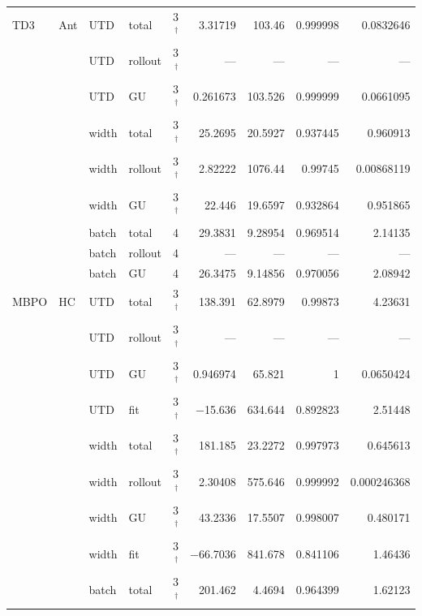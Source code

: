 {\begin{longtable}{@{}llllrrrrr@{}}
    TD3 & Ant & UTD & total & \num{3}$^{\dagger}$ & \num{3.31719} & \num{103.46} & \num{0.999998} & \num{0.0832646} \\
     &  & UTD & rollout & \num{3}$^{\dagger}$ & --- & --- & --- & --- \\
     &  & UTD & GU & \num{3}$^{\dagger}$ & \num{0.261673} & \num{103.526} & \num{0.999999} & \num{0.0661095} \\
     &  & width & total & \num{3}$^{\dagger}$ & \num{25.2695} & \num{20.5927} & \num{0.937445} & \num{0.960913} \\
     &  & width & rollout & \num{3}$^{\dagger}$ & \num{2.82222} & \num{1076.44} & \num{0.99745} & \num{0.00868119} \\
     &  & width & GU & \num{3}$^{\dagger}$ & \num{22.446} & \num{19.6597} & \num{0.932864} & \num{0.951865} \\
     &  & batch & total & \num{4} & \num{29.3831} & \num{9.28954} & \num{0.969514} & \num{2.14135} \\
     &  & batch & rollout & \num{4} & --- & --- & --- & --- \\
     &  & batch & GU & \num{4} & \num{26.3475} & \num{9.14856} & \num{0.970056} & \num{2.08942} \\
    \midrule
    MBPO & HC & UTD & total & \num{3}$^{\dagger}$ & \num{138.391} & \num{62.8979} & \num{0.99873} & \num{4.23631} \\
     &  & UTD & rollout & \num{3}$^{\dagger}$ & --- & --- & --- & --- \\
     &  & UTD & GU & \num{3}$^{\dagger}$ & \num{0.946974} & \num{65.821} & \num{1} & \num{0.0650424} \\
     &  & UTD & fit & \num{3}$^{\dagger}$ & \num{-15.636} & \num{634.644} & \num{0.892823} & \num{2.51448} \\
     &  & width & total & \num{3}$^{\dagger}$ & \num{181.185} & \num{23.2272} & \num{0.997973} & \num{0.645613} \\
     &  & width & rollout & \num{3}$^{\dagger}$ & \num{2.30408} & \num{575.646} & \num{0.999992} & \num{0.000246368} \\
     &  & width & GU & \num{3}$^{\dagger}$ & \num{43.2336} & \num{17.5507} & \num{0.998007} & \num{0.480171} \\
     &  & width & fit & \num{3}$^{\dagger}$ & \num{-66.7036} & \num{841.678} & \num{0.841106} & \num{1.46436} \\
     &  & batch & total & \num{3}$^{\dagger}$ & \num{201.462} & \num{4.4694} & \num{0.964399} & \num{1.62123} \\

\end{longtable}}
